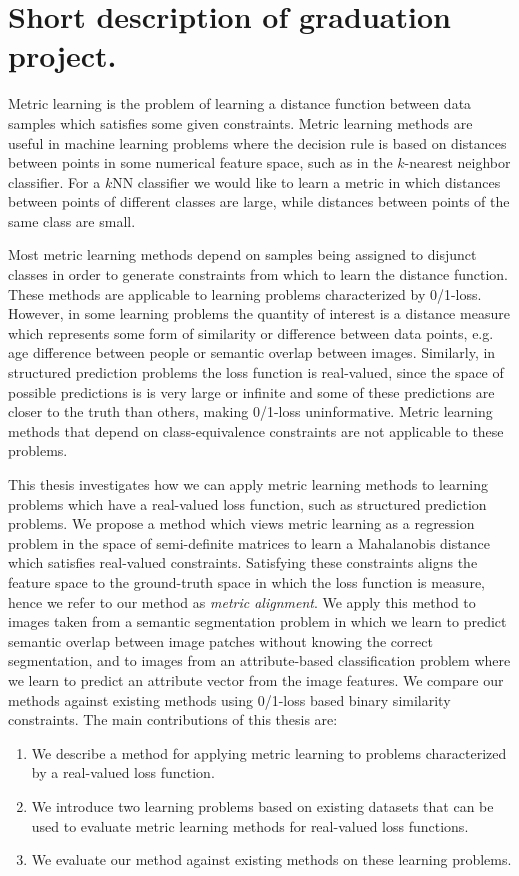 
\section*{Short description of graduation project.}

Metric learning is the problem of learning a distance function between data samples which satisfies some given constraints. Metric learning methods are useful in machine learning problems where the decision rule is based on distances between points in some numerical feature space, such as in the $k$-nearest neighbor classifier. For a $k$NN classifier we would like to learn a metric in which distances between points of different classes are large, while distances between points of the same class are small.

Most metric learning methods depend on samples being assigned to disjunct classes in order to generate constraints from which to learn the distance function. These methods are applicable to learning problems characterized by 0/1-loss. However, in some learning problems the quantity of interest is a distance measure which represents some form of similarity or difference between data points, e.g. age difference between people or semantic overlap between images. Similarly, in structured prediction problems the loss function is real-valued, since the space of possible predictions is is very large or infinite and some of these predictions are closer to the truth than others, making 0/1-loss uninformative. Metric learning methods that depend on class-equivalence constraints are not applicable to these problems.

This thesis investigates how we can apply metric learning methods to learning problems which have a real-valued loss function, such as structured prediction problems. We propose a method which views metric learning as a regression problem in the space of semi-definite matrices to learn a Mahalanobis distance which satisfies real-valued constraints. Satisfying these constraints aligns the feature space to the ground-truth space in which the loss function is measure, hence we refer to our method as \emph{metric alignment}. We apply this method to images taken from a semantic segmentation problem in which we learn to predict semantic overlap between image patches without knowing the correct segmentation, and to images from an attribute-based classification problem where we learn to predict an attribute vector from the image features. We compare our methods against existing methods using 0/1-loss based binary similarity constraints. The main contributions of this thesis are:
\begin{enumerate}
\item We describe a method for applying metric learning to problems characterized by a real-valued loss function.
\item We introduce two learning problems based on existing datasets that can be used to evaluate metric learning methods for real-valued loss functions.
\item We evaluate our method against existing methods on these learning problems.
\end{enumerate}

